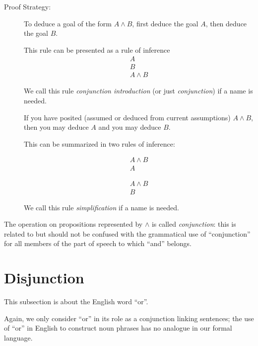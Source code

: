 \documentclass[12pt]{book}
\begin{document}
\begin{description}

\item[Proof Strategy:]

To deduce a goal of the form $A \wedge B$, first deduce the goal $A$,
then deduce the goal $B$.

This rule can be presented as a rule of inference $$\begin{array}{l} A \\ B \\ \hline A \wedge B \end{array}$$

We call this rule {\em conjunction introduction\/} (or just {\em conjunction\/}) if a name is needed.

If you have posited (assumed or deduced from current assumptions) $A
\wedge B$, then you may deduce $A$ and you may deduce $B$.

 This can be summarized in two rules of inference:

$$\begin{array}{l} A \wedge B \\ \hline A \end{array}$$

$$\begin{array}{l} A \wedge B \\ \hline B \end{array}$$

We call this rule {\em simplification\/} if a name is needed.

\end{description}

The operation on propositions represented by $\wedge$ is called {\em
conjunction\/}: this is related to but should not be confused with the
grammatical use of ``conjunction'' for all members of the part of
speech to which ``and'' belongs.

\section{Disjunction}

This subsection is about the English word ``or''.

Again, we only consider ``or'' in its role as a conjunction linking
sentences; the use of ``or'' in English to construct noun phrases has
no analogue in our formal language.
\end{document}
